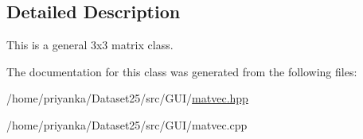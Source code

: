\subsection{\-Detailed \-Description}
\-This is a general 3x3 matrix class. 

\-The documentation for this class was generated from the following files\-:\begin{DoxyCompactItemize}
\item 
/home/priyanka/\-Dataset25/src/\-G\-U\-I/\hyperlink{matvec_8hpp}{matvec.\-hpp}\item 
/home/priyanka/\-Dataset25/src/\-G\-U\-I/matvec.\-cpp\end{DoxyCompactItemize}
